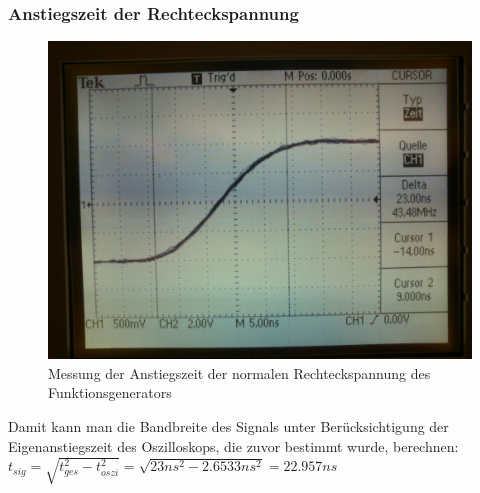 \subsubsection*{Anstiegszeit der Rechteckspannung}
\begin{figure}[H]
	\centering
	\includegraphics[width=\linewidth]{versuch3/oszi/DSC_0318.JPG}
	\caption{Messung der Anstiegszeit der normalen Rechteckspannung des Funktionsgenerators}
\end{figure}
Damit kann man die Bandbreite des Signals unter Berücksichtigung der Eigenanstiegszeit des Oszilloskops, die zuvor bestimmt wurde, berechnen:
$ t_{sig} = \sqrt{t_{ges}^2 - t_{oszi}^2} = \sqrt{23ns^2 - 2.6533ns^2} = 22.957ns $








